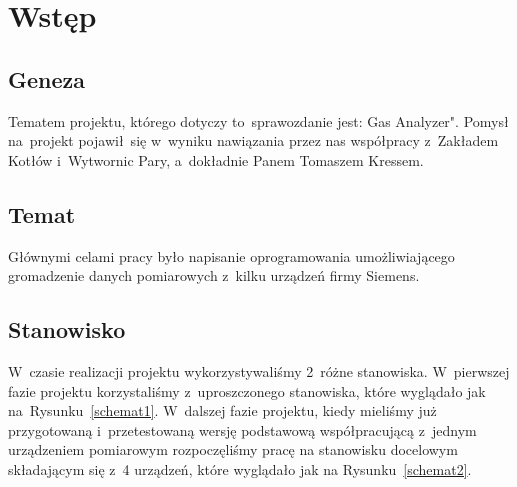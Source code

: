 \section{Wstęp}

\subsection{Geneza}
Tematem projektu, którego dotyczy to~sprawozdanie jest: Gas Analyzer". Pomysł na~projekt pojawił~się w~wyniku nawiązania przez nas współpracy z~Zakładem Kotłów i~Wytwornic Pary, a~dokładnie Panem Tomaszem Kressem.

\subsection{Temat}
Głównymi celami pracy było napisanie oprogramowania umożliwiającego gromadzenie danych pomiarowych z~kilku urządzeń firmy Siemens.

\subsection{Stanowisko}
W~czasie realizacji projektu wykorzystywaliśmy 2~różne stanowiska. W~pierwszej fazie projektu korzystaliśmy z~uproszczonego stanowiska, które wyglądało jak na~Rysunku~\ref{schemat1}. W~dalszej fazie projektu, kiedy mieliśmy już przygotowaną i~przetestowaną wersję podstawową współpracującą z~jednym urządzeniem pomiarowym rozpoczęliśmy pracę na stanowisku docelowym składającym się z~4 urządzeń, które wyglądało jak na Rysunku~\ref{schemat2}.

